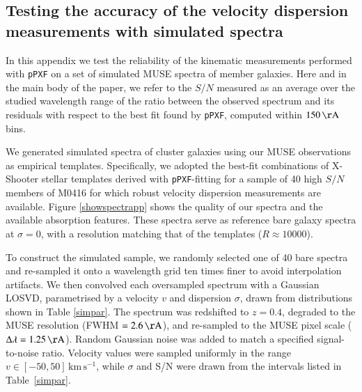 \documentclass{aa}
\begin{document}
%
%
\clearpage            %
\begin{appendix}
\section{Testing the accuracy of the velocity dispersion measurements with simulated spectra}\label{appa}

In this appendix we test the reliability of the kinematic measurements performed with \texttt{pPXF} on a set of simulated MUSE spectra of member galaxies. Here and in the main body of the paper, we refer to the $S/N$  measured as an average over the studied wavelength range of the ratio between the observed spectrum and its residuals with respect to the best fit found by \texttt{pPXF}, computed within $150 \, \mathrm{\AA}$ bins.

We generated simulated spectra of cluster galaxies using our MUSE observations as empirical templates. Specifically, we adopted the best-fit combinations of X-Shooter stellar templates derived with \texttt{pPXF}-fitting for a sample of 40 high $S/N$ members of M0416 for which robust velocity dispersion measurements are available. Figure \ref{showspectrapp} shows the quality of our spectra and the available absorption features. These spectra serve as reference bare galaxy spectra at $\sigma=0$, with a resolution matching that of the templates ($R \approx 10000$).

To construct the simulated sample, we randomly selected one of 40 bare spectra and re-sampled it onto a wavelength grid ten times finer to avoid interpolation artifacts. We then convolved each oversampled spectrum with a Gaussian LOSVD, parametrised by a velocity $v$ and dispersion $\sigma$, drawn from distributions shown in Table \ref{simpar}. The spectrum was redshifted to $z=0.4$, degraded to the MUSE resolution (FWHM $= 2.6\,\mathrm{\AA}$), and re-sampled to the MUSE pixel scale ($\Delta\lambda = 1.25\,\mathrm{\AA}$). Random Gaussian noise was added to match a specified signal-to-noise ratio. Velocity values were sampled uniformly in the range $v \in [-50, 50]\,\mathrm{km\,s^{-1}}$, while $\sigma$ and S/N were drawn from the intervals listed in Table~\ref{simpar}.


\end{appendix}
\end{document}
